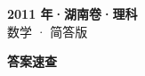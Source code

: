 \documentclass[zihao=-4, a4paper]{ctexart}
\begin{document}
\begin{center}
  {\Large\bfseries 2011 年·湖南卷·理科}\\[4pt]
  {\large 数学 · 简答版}
\end{center}
\medskip
{}

\clearpage
{}
\begin{center}{\Large\bfseries 答案速查}\end{center}
\medskip

\end{document}

